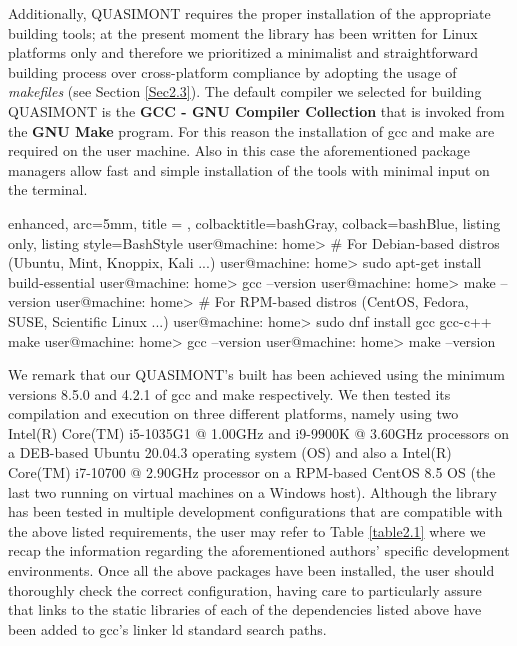 \documentclass[a4paper, twosided]{book}
\begin{document}
\noindent
Additionally, QUASIMONT requires the proper installation of the appropriate building tools; at the present moment the library has been written for Linux platforms only and therefore we prioritized a minimalist and straightforward building process over cross-platform compliance by adopting the usage of {\itshape makefiles} (see Section \ref{Sec2.3}). The default compiler we selected for building QUASIMONT is the \color{poliDarkBlue} \textbf{GCC - GNU Compiler Collection} \color{black} \cite{gcc} that is invoked from the \color{poliDarkBlue} \textbf{GNU Make} \color{black} \cite{make} program. For this reason the installation of \colorbox{poliGrayBlue}{gcc} and \colorbox{poliGrayBlue}{make} are required on the user machine. Also in this case the aforementioned package managers allow fast and simple installation of the tools with minimal input on the terminal.

\vspace{0.2cm}
\begin{tcblisting}{enhanced,
                   arc=5mm,
                   title = \color{black}{\large \ttfamily Installation of building tools},
                   colbacktitle=bashGray,
                   colback=bashBlue,
                   listing only,
                   listing style=BashStyle}
user@machine: home> # For Debian-based distros (Ubuntu, Mint, Knoppix, Kali ...)
user@machine: home> sudo apt-get install build-essential
user@machine: home> gcc --version
user@machine: home> make --version
user@machine: home> # For RPM-based distros (CentOS, Fedora, SUSE, Scientific Linux ...)
user@machine: home> sudo dnf install gcc gcc-c++ make
user@machine: home> gcc --version
user@machine: home> make --version
\end{tcblisting}
\vspace{0.3cm}

\noindent
We remark that our QUASIMONT's built has been achieved using the minimum versions \colorbox{poliGrayBlue}{8.5.0} and \colorbox{poliGrayBlue}{4.2.1} of \colorbox{poliGrayBlue}{gcc} and \colorbox{poliGrayBlue}{make} respectively. We then tested its compilation and execution on three different platforms, namely using two Intel(R) Core(TM) i5-1035G1 @ 1.00GHz and i9-9900K @ 3.60GHz processors on a DEB-based \colorbox{poliGrayBlue}{Ubuntu 20.04.3} operating system (OS) and also a Intel(R) Core(TM) i7-10700 @ 2.90GHz processor on a RPM-based \colorbox{poliGrayBlue}{CentOS 8.5} OS (the last two running on virtual machines on a Windows host). Although the library has been tested in multiple development configurations that are compatible with the above listed requirements, the user may refer to Table \ref{table2.1} where we recap the information regarding the aforementioned authors' specific development environments. Once all the above packages have been installed, the user should thoroughly check the correct configuration, having care to particularly assure that links to the static libraries of each of the dependencies listed above have been added to \colorbox{poliGrayBlue}{gcc}'s linker \colorbox{poliGrayBlue}{ld} standard search paths.
\end{document}
